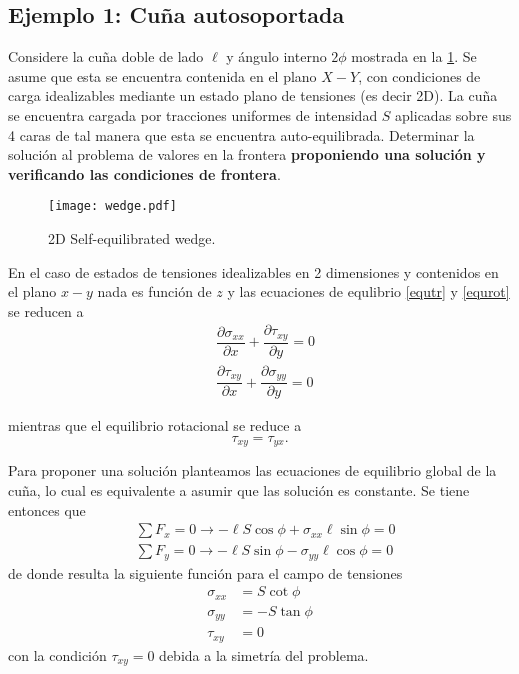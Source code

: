 \documentclass[../notas medios.tex]{subfiles}
\begin{document}
\subsection*{Ejemplo 1: Cuña autosoportada}

Considere la cuña doble de lado $\ell$ y ángulo interno $2 \phi$ mostrada en la \cref{WEDGE}. Se asume que esta se encuentra contenida en el plano $X-Y$, con condiciones de carga idealizables mediante un estado plano de tensiones (es decir 2D). La cuña se encuentra cargada por tracciones uniformes de intensidad $S$ aplicadas sobre sus 4 caras de tal manera que esta se encuentra auto-equilibrada. Determinar la solución al problema de valores en la frontera {\bf proponiendo una solución y verificando las condiciones de frontera}.
\begin{figure}[H]
\centering
\texttt{[image: wedge.pdf]}
\caption{2D Self-equilibrated wedge.}
\label{WEDGE}
\end{figure}


En el caso de estados de tensiones idealizables en 2 dimensiones y contenidos en el plano $x-y$ nada es función de $z$ y las ecuaciones de equlibrio \cref{equtr} y \cref{equrot} se reducen a
\begin{equation}
\begin{aligned}
&\dfrac{\partial\sigma_{xx}}{\partial x}+\dfrac{\partial\tau_{xy}}{\partial y}=0\\
&\dfrac{\partial\tau_{xy}}{\partial x}+\dfrac{\partial\sigma_{yy}}{\partial y}=0
\end{aligned}
\label{equilibrium}
\end{equation}

mientras que el equilibrio rotacional se reduce a
\[\tau_{xy} = \tau_{yx}.\]

Para proponer una solución planteamos las ecuaciones de equilibrio global de la cuña, lo cual es equivalente a asumir que las solución es constante. Se tiene entonces que
\begin{align*}
&\sum F_x=0 \longrightarrow -\ell S \cos\phi + \sigma_{xx}\ell \sin\phi=0\\
&\sum F_y=0 \longrightarrow -\ell S \sin\phi - \sigma_{yy}\ell \cos\phi=0
\end{align*}
de donde resulta la siguiente función para el campo de tensiones
\begin{equation}
\begin{aligned}
\sigma_{xx}&=S\cot\phi\\
\sigma_{yy}&=-S\tan\phi\\
\tau_{xy}&=0
\end{aligned}
\label{solution}
\end{equation}
con la condición $\tau_{xy}=0$ debida a la simetría del problema.
\end{document}
